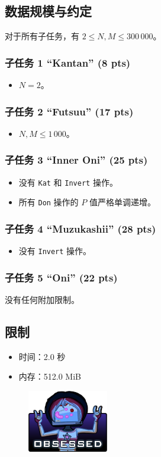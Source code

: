 \documentclass[UTF8, 11pt, a4paper]{article}
\begin{document}
\subsection*{数据规模与约定}
对于所有子任务，有 $2 \leq N, M \leq 300\,000$。
\subsubsection*{子任务 1 “Kantan” (8 pts)}
\begin{itemize}
    \item $N = 2$。
\end{itemize}
\subsubsection*{子任务 2 “Futsuu” (17 pts)}
\begin{itemize}
    \item $N, M \leq 1\,000$。
\end{itemize}
\subsubsection*{子任务 3 “Inner Oni” (25 pts)}
\begin{itemize}
    \item 没有 \texttt{Kat} 和 \texttt{Invert} 操作。
    \item 所有 \texttt{Don} 操作的 $P$ 值严格单调递增。
\end{itemize}
\subsubsection*{子任务 4 “Muzukashii” (28 pts)}
\begin{itemize}
    \item 没有 \texttt{Invert} 操作。
\end{itemize}
\subsubsection*{子任务 5 “Oni” (22 pts)}
    没有任何附加限制。

\subsection*{限制}
\begin{itemize}
\item 时间：2.0 秒
\item 内存：512.0 MiB
\end{itemize}

\begin{figure}[h]\centering
\includegraphics[scale=0.55]{obsessed.png}
\end{figure}
\end{document}
